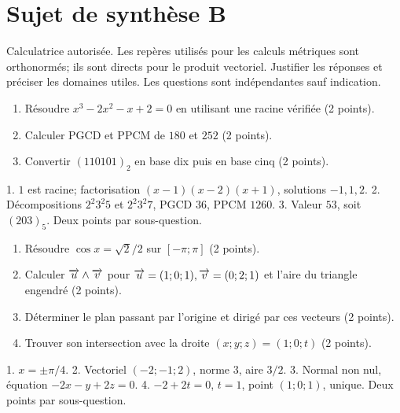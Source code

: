 \begingroup
\chapter*{Sujet de synthèse B}
\renewcommand{\thebmtexo}{SYN2.\arabic{bmtexo}}
\renewcommand{\theHbmtexo}{SYN2.\arabic{bmtexo}}
\setcounter{bmtexo}{0}
\begin{devoir}[3 h — 20 points]
Calculatrice autorisée. Les repères utilisés pour les calculs métriques sont orthonormés; ils sont directs pour le produit vectoriel. Justifier les réponses et préciser les domaines utiles. Les questions sont indépendantes sauf indication. 
\end{devoir}
\label{t11s-syn2-e01}
\begin{enumerate}\item Résoudre $x^3-2x^2-x+2=0$ en utilisant une racine vérifiée (2 points).
\item Calculer PGCD et PPCM de $180$ et $252$ (2 points).
\item Convertir $(110101)_2$ en base dix puis en base cinq (2 points).\end{enumerate}
\begin{corrige}\label{sol-t11s-syn2-e01}
1. $1$ est racine; factorisation $(x-1)(x-2)(x+1)$, solutions $-1,1,2$.
2. Décompositions $2^2 3^2 5$ et $2^2 3^2 7$, PGCD $36$, PPCM $1260$.
3. Valeur $53$, soit $(203)_5$. Deux points par sous-question.
\end{corrige}
\label{t11s-syn2-e02}
\begin{enumerate}\item Résoudre $\cos x=\sqrt2/2$ sur $[-\pi;\pi]$ (2 points).
\item Calculer $\overrightarrow{u}\wedge\overrightarrow{v}$ pour $\overrightarrow{u}=(1;0;1),\overrightarrow{v}=(0;2;1)$ et l’aire du triangle engendré (2 points).
\item Déterminer le plan passant par l’origine et dirigé par ces vecteurs (2 points).
\item Trouver son intersection avec la droite $(x;y;z)=(1;0;t)$ (2 points).\end{enumerate}
\begin{corrige}\label{sol-t11s-syn2-e02}
1. $x=\pm\pi/4$.
2. Vectoriel $(-2;-1;2)$, norme $3$, aire $3/2$.
3. Normal non nul, équation $-2x-y+2z=0$.
4. $-2+2t=0$, $t=1$, point $(1;0;1)$, unique. Deux points par sous-question.
\end{corrige}

